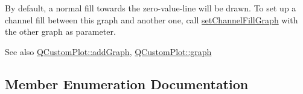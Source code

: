 By default, a normal fill towards the zero-\/value-\/line will be drawn. To set up a channel fill between this graph and another one, call \hyperlink{classQCPGraph_a2d03156df1b64037a2e36cfa50351ca3}{set\+Channel\+Fill\+Graph} with the other graph as parameter.

\begin{DoxySeeAlso}{See also}
\hyperlink{classQCustomPlot_a6fb2873d35a8a8089842d81a70a54167}{Q\+Custom\+Plot\+::add\+Graph}, \hyperlink{classQCustomPlot_a6d3ed93c2bf46ab7fa670d66be4cddaf}{Q\+Custom\+Plot\+::graph} 
\end{DoxySeeAlso}


\subsection{Member Enumeration Documentation}
